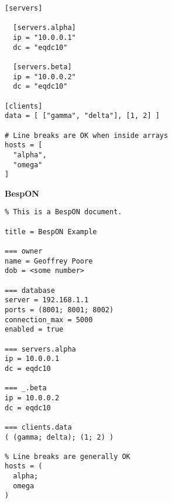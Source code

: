 \documentclass[11pt]{article}
\begin{document}
\begin{appendices}
\begin{tcolorbox}{}
\begin{multicols}{2}
\begin{Verbatim}[formatcom=\color{DarkGreen}]
[servers]

  [servers.alpha]
  ip = "10.0.0.1"
  dc = "eqdc10"

  [servers.beta]
  ip = "10.0.0.2"
  dc = "eqdc10"

[clients]
data = [ ["gamma", "delta"], [1, 2] ]

# Line breaks are OK when inside arrays
hosts = [
  "alpha",
  "omega"
]
\end{Verbatim}
\columnbreak
\centering \textbf{BespON}

\begin{Verbatim}
% This is a BespON document.

title = BespON Example

=== owner
name = Geoffrey Poore
dob = <some number>

=== database
server = 192.168.1.1
ports = (8001; 8001; 8002)
connection_max = 5000
enabled = true

=== servers.alpha
ip = 10.0.0.1
dc = eqdc10

=== _.beta
ip = 10.0.0.2
dc = eqdc10

=== clients.data
( (gamma; delta); (1; 2) )

% Line breaks are generally OK
hosts = (
  alpha;
  omega
)
\end{Verbatim}
\end{multicols}
\end{tcolorbox}



\end{appendices}
\end{document}

